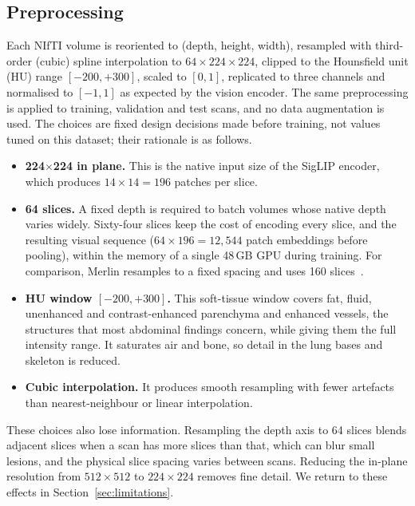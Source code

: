 \documentclass[conference]{IEEEtran}
\begin{document}
\subsection{Preprocessing}
Each NIfTI volume is reoriented to (depth, height, width), resampled with
third-order (cubic) spline interpolation to $64\times224\times224$, clipped
to the Hounsfield unit (HU) range $[-200,+300]$, scaled to $[0,1]$,
replicated to three channels and normalised to $[-1,1]$ as expected by the
vision encoder. The same preprocessing is applied to training, validation
and test scans, and no data augmentation is used. The choices are fixed
design decisions made before training, not values tuned on this dataset;
their rationale is as follows.
\begin{itemize}
\item \textbf{224$\times$224 in plane.} This is the native input size of the
SigLIP encoder, which produces $14\times14=196$ patches per slice.
\item \textbf{64 slices.} A fixed depth is required to batch volumes whose
native depth varies widely. Sixty-four slices keep the cost of encoding every
slice, and the resulting visual sequence ($64\times196=12{,}544$ patch
embeddings before pooling), within the memory of a single 48\,GB GPU during
training. For comparison, Merlin resamples to a fixed spacing and uses 160
slices~\cite{merlin}.
\item \textbf{HU window $[-200,+300]$.} This soft-tissue window covers fat,
fluid, unenhanced and contrast-enhanced parenchyma and enhanced vessels, the
structures that most abdominal findings concern, while giving them the full
intensity range. It saturates air and bone, so detail in the lung bases and
skeleton is reduced.
\item \textbf{Cubic interpolation.} It produces smooth resampling with fewer
artefacts than nearest-neighbour or linear interpolation.
\end{itemize}
These choices also lose information. Resampling the depth axis to 64 slices
blends adjacent slices when a scan has more slices than that, which can blur
small lesions, and the physical slice spacing varies between scans. Reducing
the in-plane resolution from $512\times512$ to $224\times224$ removes fine
detail. We return to these effects in Section~\ref{sec:limitations}.
\end{document}
